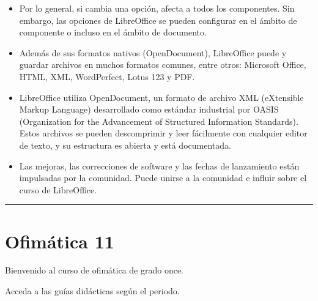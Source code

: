 \documentclass[letterpaper,10pt,spanish]{sphinxmanual}
\begin{document}
\begin{itemize}
\begin{itemize}
\end{itemize}

\item {} 
\sphinxAtStartPar
{} Por lo general, si cambia una opción, afecta a todos los componentes. Sin embargo, las opciones de LibreOffice se pueden configurar en el ámbito de componente o incluso en el ámbito de documento.

\item {} 
\sphinxAtStartPar
{} Además de sus formatos nativos (OpenDocument), LibreOffice puede y guardar archivos en muchos formatos comunes, entre otros: Microsoft Office, HTML, XML, WordPerfect, Lotus 1\sphinxhyphen{}2\sphinxhyphen{}3 y PDF.

\item {} 
\sphinxAtStartPar
{} LibreOffice utiliza OpenDocument, un formato de archivo XML (eXtensible Markup Language) desarrollado como estándar industrial por OASIS (Organization for the Advancement of Structured Information Standards). Estos archivos se pueden descomprimir y leer fácilmente con cualquier editor de texto, y su estructura es abierta y está documentada.

\item {} 
\sphinxAtStartPar
{} Las mejoras, las correcciones de software y las fechas de lanzamiento están impulsadas por la comunidad. Puede unirse a la comunidad e influir sobre el curso de LibreOffice.

\end{itemize}


\bigskip\hrule\bigskip


\sphinxstepscope


\chapter{Ofimática 11}
\label{\detokenize{cursos/ofimatica11/index:ofimatica-11}}\label{\detokenize{cursos/ofimatica11/index::doc}}
\sphinxAtStartPar
Bienvenido al curso de ofimática de grado once.

\sphinxAtStartPar
Acceda a las guías didácticas según el periodo.

\sphinxstepscope
\end{document}
